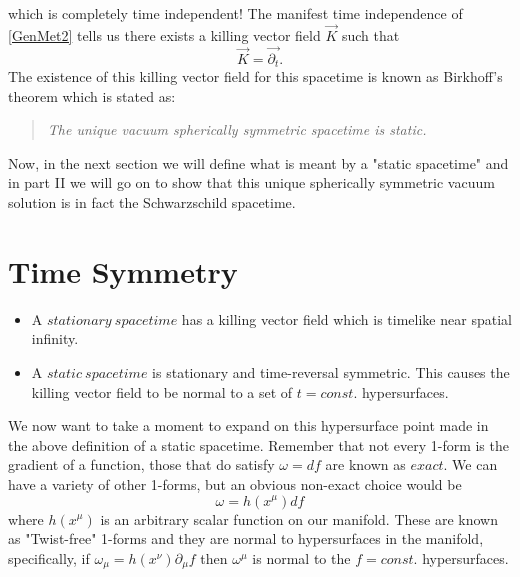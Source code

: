 \documentclass[11pt,table]{article}
\begin{document}
            which is completely time independent!  The manifest time independence of \eqref{GenMet2} tells us there exists a killing vector field $\Vec{K}$ such that
            $$
            \Vec{K} = \vec{\partial_t}.
            $$
            The existence of this killing vector field for this spacetime is known as Birkhoff's theorem which is stated as:
            \begin{quote}
                \it{The unique vacuum spherically symmetric spacetime is static.}
            \end{quote}
            Now, in the next section we will define what is meant by a "static spacetime" and in part II we will go on to show that this unique spherically symmetric vacuum solution is in fact the Schwarzschild spacetime.
            
        \section{Time Symmetry}\label{sec:TimeSym}
            \begin{itemize}
                \item A $stationary\ spacetime$ has a killing vector field which is timelike near spatial infinity.
                
                \item A $static\ spacetime$ is stationary and time-reversal symmetric.  This causes the killing vector field to be normal to a set of $t=const.$ hypersurfaces.
            \end{itemize}
    
            We now want to take a moment to expand on this hypersurface point made in the above definition of a static spacetime.  Remember that not every 1-form is the gradient of a function, those that do satisfy $\omega = df$ are known as $exact$.  We can have a variety of other 1-forms, but an obvious non-exact choice would be 
            $$
            \omega = h(x^{\mu})df
            $$
            where $h(x^{\mu})$ is an arbitrary scalar function on our manifold.  These are known as "Twist-free" 1-forms and they are normal to hypersurfaces in the manifold, specifically, if $\omega_{\mu} = h(x^{\nu})\partial_{\mu}f$ then $\omega^{\mu}$ is normal to the $f=const.$ hypersurfaces.
    
\end{document}
